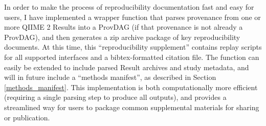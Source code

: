 In order to make the process of reproducibility documentation fast and easy for
users, I have implemented a wrapper function that parses provenance from one or
more QIIME 2 Results into a ProvDAG (if that provenance is not already a
ProvDAG), and then generates a zip archive package of key reproducibility
documents. At this time, this “reproducibility supplement” contains replay
scripts for all supported interfaces and a bibtex-formatted citation file. The
function can easily be extended to include parsed Result archives and study
metadata, and will in future include a “methods manifest”, as described in
Section \ref{methods_manifest}. This implementation is both computationally more efficient
(requiring a single parsing step to produce all outputs), and provides a
streamlined way for users to package common supplemental materials for sharing
or publication.
